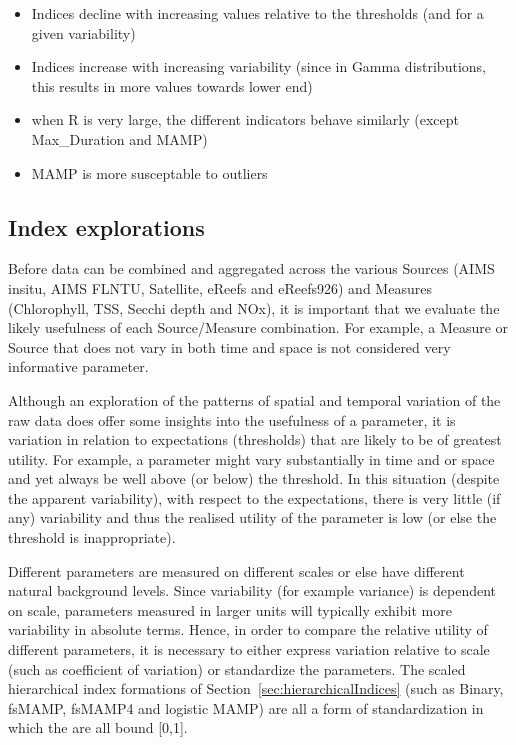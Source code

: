 \clearpage


\begin{itemize}
\item Indices decline with increasing values relative to the thresholds (and for a given
variability)
\item Indices increase with increasing variability (since in Gamma distributions, this results in
more values towards lower end)
\item when R is very large, the different indicators behave similarly (except Max\_Duration and
MAMP)
\item MAMP is more susceptable to outliers
\end{itemize}

\clearpage

\subsection{Index explorations}

Before data can be combined and aggregated across the various Sources (AIMS insitu, AIMS FLNTU,
Satellite, eReefs and eReefs926) and Measures (Chlorophyll, TSS, Secchi depth and NOx), it is
important that we evaluate the likely usefulness of each Source/Measure combination.  For example, a
Measure or Source that does not vary in both time and space is not considered very informative
parameter.

Although an exploration of the patterns of spatial and temporal variation of the raw data does offer
some insights into the usefulness of a parameter, it is variation in relation to expectations
(thresholds) that are likely to be of greatest utility.  For example, a parameter might vary
substantially in time and or space and yet always be well above (or below) the threshold.  In this
situation (despite the apparent variability), with respect to the expectations, there is very little
(if any) variability and thus the realised utility of the parameter is low (or else the threshold is
inappropriate).

Different parameters are measured on different scales or else have different natural background
levels.  Since variability (for example variance) is dependent on scale, parameters measured in
larger units will typically exhibit more variability in absolute terms.  Hence, in order to compare
the relative utility of different parameters, it is necessary to either express variation relative
to scale (such as coefficient of variation) or standardize the parameters.  The scaled hierarchical
index formations of Section~\ref{sec:hierarchicalIndices} (such as Binary, fsMAMP, fsMAMP4 and
logistic MAMP) are all a form of standardization in which the are all bound [0,1].


